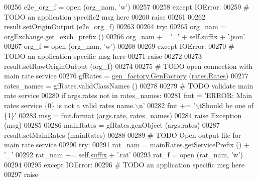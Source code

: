 \begin{DoxyCode}
{00256             e2e\_org\_f = open (org\_nam, \textcolor{stringliteral}{'w'})
00257             
00258         \textcolor{keywordflow}{except} IOError:
00259             \textcolor{comment}{# TODO an application specific2 msg here}
00260             \textcolor{keywordflow}{raise}
00261 
00262         result.setOriginOutput (e2e\_org\_f)
00263             
00264         \textcolor{keywordflow}{try}:
00265             org\_nam  = orgExchange.get\_exch\_prefix ()
00266             org\_nam += \textcolor{stringliteral}{'\_'} + self.\hyperlink{classe2e_1_1_application_a4d824ad36b051d2d629edb314385df0d}{suffix} + \textcolor{stringliteral}{'.json'}
00267             org\_f = open (org\_nam, \textcolor{stringliteral}{'w'})
00268             
00269         \textcolor{keywordflow}{except} IOError:
00270             \textcolor{comment}{# TODO an application specific msg here}
00271             \textcolor{keywordflow}{raise}
00272             
00273         result.setRawOriginOutput (org\_f)
00274             
00275         \textcolor{comment}{# TODO open connection with main rate service}
00276         gfRates = \hyperlink{classgen__factory_1_1_gen_factory}{gen\_factory.GenFactory} (\hyperlink{classrates_1_1_rates}{rates.Rates})
00277         rates\_names = gfRates.validClassNames ()
00278 
00279         \textcolor{comment}{# TODO validate main rate service}
00280         \textcolor{keywordflow}{if} args.rates \textcolor{keywordflow}{not} \textcolor{keywordflow}{in} rates\_names:
00281             fmt  = \textcolor{stringliteral}{'ERROR: Main rates service \{0\} is not a valid rates name.\(\backslash\)n'}
00282             fmt += \textcolor{stringliteral}{'\(\backslash\)tShould be one of \{1\}'}
00283             msg = fmt.format (args.rate, rates\_names)
00284             \textcolor{keywordflow}{raise} Exception (msg)
00285 
00286         mainRates = gfRates.genObject (args.rates)
00287         result.setMainRates (mainRates)
00288         
00289         \textcolor{comment}{# TODO Open output file for main rate service}
00290         \textcolor{keywordflow}{try}:
00291             rat\_nam  =  mainRates.getServicePrefix () + \textcolor{stringliteral}{'\_'}
00292             rat\_nam +=  self.\hyperlink{classe2e_1_1_application_a4d824ad36b051d2d629edb314385df0d}{suffix} + \textcolor{stringliteral}{'.rat'}
00293             rat\_f = open (rat\_nam, \textcolor{stringliteral}{'w'})
00294             
00295         \textcolor{keywordflow}{except} IOError:
00296             \textcolor{comment}{# TODO an application specific msg here}
00297             \textcolor{keywordflow}{raise}        
}
\end{DoxyCode}
